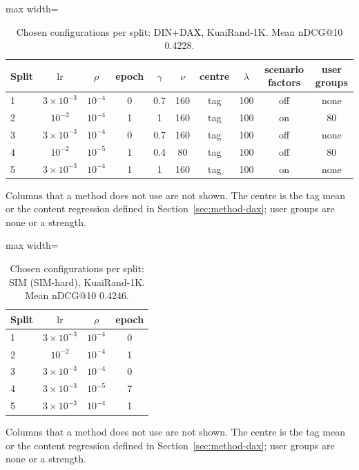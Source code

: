 \documentclass[preprint,12pt,authoryear]{elsarticle}
\begin{document}
\begin{table}[tbp]
\centering
\footnotesize
\caption{Chosen configurations per split: DIN+DAX, KuaiRand-1K. Mean nDCG@10 0.4228.}
\label{tab:grid15}
\begin{adjustbox}{max width=\linewidth}
\begin{tabular}{lccccccccc}
\toprule
Split & $\mathrm{lr}$ & $\rho$ & epoch & $\gamma$ & $\nu$ & centre & $\lambda$ & scenario factors & user groups \\
\midrule
1 & $3\times10^{-3}$ & $10^{-4}$ & 0 & 0.7 & 160 & tag & 100 & off & none \\
2 & $10^{-2}$ & $10^{-4}$ & 1 & 1 & 160 & tag & 100 & on & 80 \\
3 & $3\times10^{-3}$ & $10^{-4}$ & 0 & 0.7 & 160 & tag & 100 & off & none \\
4 & $10^{-2}$ & $10^{-5}$ & 1 & 0.4 & 80 & tag & 100 & off & 80 \\
5 & $3\times10^{-3}$ & $10^{-4}$ & 1 & 1 & 160 & tag & 100 & on & none \\
\bottomrule
\end{tabular}
\end{adjustbox}
\par\smallskip
\begin{minipage}{\linewidth}\raggedright\footnotesize Columns that a method does not use are not shown. The centre is the tag mean or the content regression defined in Section~\ref{sec:method-dax}; user groups are none or a strength.\end{minipage}
\end{table}

\begin{table}[tbp]
\centering
\footnotesize
\caption{Chosen configurations per split: SIM (SIM-hard), KuaiRand-1K. Mean nDCG@10 0.4246.}
\label{tab:grid16}
\begin{adjustbox}{max width=\linewidth}
\begin{tabular}{lccc}
\toprule
Split & $\mathrm{lr}$ & $\rho$ & epoch \\
\midrule
1 & $3\times10^{-3}$ & $10^{-4}$ & 0 \\
2 & $10^{-2}$ & $10^{-4}$ & 1 \\
3 & $3\times10^{-3}$ & $10^{-4}$ & 0 \\
4 & $3\times10^{-3}$ & $10^{-5}$ & 7 \\
5 & $3\times10^{-3}$ & $10^{-4}$ & 1 \\
\bottomrule
\end{tabular}
\end{adjustbox}
\par\smallskip
\begin{minipage}{\linewidth}\raggedright\footnotesize Columns that a method does not use are not shown. The centre is the tag mean or the content regression defined in Section~\ref{sec:method-dax}; user groups are none or a strength.\end{minipage}
\end{table}
\end{document}
